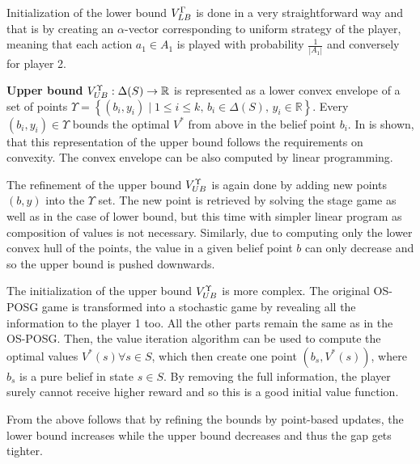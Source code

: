 \documentclass[../main.tex]{subfiles}
\begin{document}
Initialization of the lower bound $V_{LB}^{\Gamma}$ is done in a very straightforward way and that is by creating an $\alpha$-vector corresponding to uniform strategy of the player, meaning that each action $a_1 \in A_1$ is played with probability $\frac{1}{|A_1|}$ and conversely for player 2.

\textbf{Upper bound} $V_{UB}^{\Upsilon} : \Delta(S) \to \mathbb{R}$ is represented as a lower convex envelope of a set of points $\Upsilon = \left\{(b_i, y_i) \mid 1 \leq i \leq k, \, b_i \in \Delta(S), \, y_i \in \mathbb{R}\right\}$.
Every $(b_i, y_i) \in \Upsilon$ bounds the optimal $V^*$ from above in the belief point $b_i$.
In \cite{poposgsthesis} is shown, that this representation of the upper bound follows the requirements on convexity.
The convex envelope can be also computed by linear programming.

The refinement of the upper bound $V_{UB}^{\Upsilon}$ is again done by adding new points $(b, y)$ into the $\Upsilon$ set.
The new point is retrieved by solving the stage game as well as in the case of lower bound, but this time with simpler linear program as composition of values is not necessary.
Similarly, due to computing only the lower convex hull of the points, the value in a given belief point $b$ can only decrease and so the upper bound is pushed downwards.

The initialization of the upper bound $V_{UB}^{\Upsilon}$ is more complex.
The original OS-POSG game is transformed into a stochastic game by revealing all the information to the player 1 too.
All the other parts remain the same as in the OS-POSG.
Then, the value iteration algorithm can be used to compute the optimal values $V^*(s) \forall s \in S$, which then create one point $\left(b_s, V^*(s)\right)$, where $b_s$ is a pure belief in state $s \in S$.
By removing the full information, the player surely cannot receive higher reward and so this is a good initial value function.

From the above follows that by refining the bounds by point-based updates, the lower bound increases while the upper bound decreases and thus the gap gets tighter.
\end{document}
